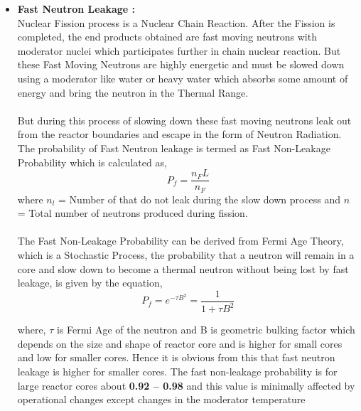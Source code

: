 \documentclass{article}
\begin{document}
\begin{itemize}
    \begin{itemize}
        \item \textbf{Fast Neutron Leakage :}\\
            Nuclear Fission process is a Nuclear Chain Reaction. After the Fission is completed, the end products obtained are fast moving neutrons with moderator nuclei which participates further in chain nuclear reaction. But these Fast Moving Neutrons are highly energetic and must be slowed down using a moderator like water or heavy water which absorbs some amount of energy and bring the neutron in the Thermal Range.\\
            \\
            But during this process of slowing down these fast moving neutrons leak out from the reactor boundaries and escape in the form of Neutron Radiation. The probability of Fast Neutron leakage is termed as Fast Non-Leakage Probability which is calculated as,
            $$P_f = \frac{n_FL}{n_F}$$
            where $n_l$ = Number of that do not leak during the slow down process and $n$ = Total number of neutrons produced during fission.\\ 
            \\
            The Fast Non-Leakage Probability can be derived from Fermi Age Theory, which is a Stochastic Process, the probability that a neutron will remain in a core and slow down to become a thermal neutron without being lost by fast leakage, is given by the equation,
            $$P_f = e^{-\tau B^2} = \frac{1}{1 + \tau B^2}$$
            
            where, $\tau$ is Fermi Age of the neutron and B is geometric bulking factor which depends on the size and shape of reactor core and is higher for small cores and low for smaller cores. Hence it is obvious from this that fast neutron leakage is higher for smaller cores. The fast non-leakage probability is for large reactor cores about \textbf{0.92 – 0.98} and this value is minimally affected by operational changes except changes in the moderator temperature\cite{cite10}\\
            

\end{itemize}
\end{itemize}
\end{document}
